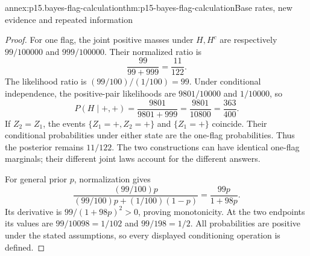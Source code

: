 \begin{annexitem}{annex:p15.bayes-flag-calculation}{thm:p15-bayes-flag-calculation}{Base rates, new evidence and repeated information}
\begin{proof}
For one flag, the joint positive masses under \(H,H^c\) are
respectively \(99/100000\) and \(999/100000\). Their normalized
ratio is
\[
              \frac{99}{99+999}=\frac{11}{122}.
\]
The likelihood ratio is \((99/100)/(1/100)=99\).
Under conditional independence, the positive-pair likelihoods
are \(9801/10000\) and \(1/10000\), so
\[
 P(H\mid+,+)=\frac{9801}{9801+999}
            =\frac{9801}{10800}=\frac{363}{400}.
\]
If \(Z_2=Z_1\), the events
\(\{Z_1=+,Z_2=+\}\) and \(\{Z_1=+\}\) coincide. Their
conditional probabilities under either state are the one-flag
probabilities. Thus the posterior remains \(11/122\).
The two constructions can have identical one-flag marginals;
their different joint laws account for the different answers.

For general prior \(p\), normalization gives
\[
       \frac{(99/100)p}{(99/100)p+(1/100)(1-p)}
                          =\frac{99p}{1+98p}.
\]
Its derivative is \(99/(1+98p)^2>0\), proving monotonicity.
At the two endpoints its values are
\(99/10098=1/102\) and \(99/198=1/2\).
All probabilities are positive under the stated assumptions,
so every displayed conditioning operation is defined.
\end{proof}
\end{annexitem}

